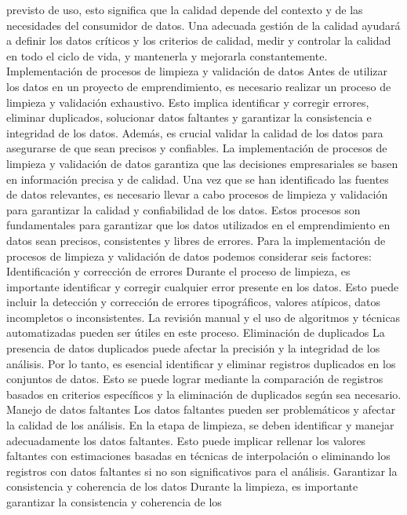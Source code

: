 \documentclass[
  letterpaper,
  DIV=11,
  numbers=noendperiod]{scrreprt}
\begin{document}
previsto de uso, esto significa que la calidad depende del contexto y de
las necesidades del consumidor de datos. Una adecuada gestión de la
calidad ayudará a definir los datos críticos y los criterios de calidad,
medir y controlar la calidad en todo el ciclo de vida, y mantenerla y
mejorarla constantemente. Implementación de procesos de limpieza y
validación de datos Antes de utilizar los datos en un proyecto de
emprendimiento, es necesario realizar un proceso de limpieza y
validación exhaustivo. Esto implica identificar y corregir errores,
eliminar duplicados, solucionar datos faltantes y garantizar la
consistencia e integridad de los datos. Además, es crucial validar la
calidad de los datos para asegurarse de que sean precisos y confiables.
La implementación de procesos de limpieza y validación de datos
garantiza que las decisiones empresariales se basen en información
precisa y de calidad. Una vez que se han identificado las fuentes de
datos relevantes, es necesario llevar a cabo procesos de limpieza y
validación para garantizar la calidad y confiabilidad de los datos.
Estos procesos son fundamentales para garantizar que los datos
utilizados en el emprendimiento en datos sean precisos, consistentes y
libres de errores. Para la implementación de procesos de limpieza y
validación de datos podemos considerar seis factores: Identificación y
corrección de errores Durante el proceso de limpieza, es importante
identificar y corregir cualquier error presente en los datos. Esto puede
incluir la detección y corrección de errores tipográficos, valores
atípicos, datos incompletos o inconsistentes. La revisión manual y el
uso de algoritmos y técnicas automatizadas pueden ser útiles en este
proceso. Eliminación de duplicados La presencia de datos duplicados
puede afectar la precisión y la integridad de los análisis. Por lo
tanto, es esencial identificar y eliminar registros duplicados en los
conjuntos de datos. Esto se puede lograr mediante la comparación de
registros basados en criterios específicos y la eliminación de
duplicados según sea necesario. Manejo de datos faltantes Los datos
faltantes pueden ser problemáticos y afectar la calidad de los análisis.
En la etapa de limpieza, se deben identificar y manejar adecuadamente
los datos faltantes. Esto puede implicar rellenar los valores faltantes
con estimaciones basadas en técnicas de interpolación o eliminando los
registros con datos faltantes si no son significativos para el análisis.
Garantizar la consistencia y coherencia de los datos Durante la
limpieza, es importante garantizar la consistencia y coherencia de los
\end{document}
